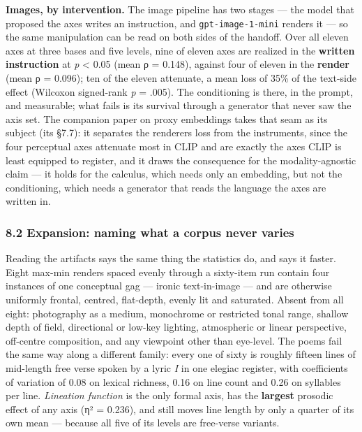 \documentclass[
  10pt,
]{article}
\theoremstyle{plain}
\theoremstyle{definition}
\begin{document}
\textbf{Images, by intervention.} The image pipeline has two stages ---
the model that proposed the axes writes an instruction, and
\texttt{gpt-image-1-mini} renders it --- so the same manipulation can be
read on both sides of the handoff. Over all eleven axes at three bases
and five levels, nine of eleven axes are realized in the \textbf{written
instruction} at \emph{p} \textless{} 0.05 (mean ρ = 0.148), against four
of eleven in the \textbf{render} (mean ρ = 0.096); ten of the eleven
attenuate, a mean loss of 35\% of the text-side effect (Wilcoxon
signed-rank \emph{p} = .005). The conditioning is there, in the prompt,
and measurable; what fails is its survival through a generator that
never saw the axis set. The companion paper on proxy embeddings takes
that seam as its subject (its §7.7): it separates the
renderer\textquotesingle s loss from the instrument\textquotesingle s,
since the four perceptual axes attenuate most in CLIP and are exactly
the axes CLIP is least equipped to register, and it draws the
consequence for the modality-agnostic claim --- it holds for the
calculus, which needs only an embedding, but not the conditioning, which
needs a generator that reads the language the axes are written in.

\subsubsection{8.2 Expansion: naming what a corpus never
varies}\label{82-expansion-naming-what-a-corpus-never-varies}

Reading the artifacts says the same thing the statistics do, and says it
faster. Eight max-min renders spaced evenly through a sixty-item run
contain four instances of one conceptual gag --- ironic text-in-image
--- and are otherwise uniformly frontal, centred, flat-depth, evenly lit
and saturated. Absent from all eight: photography as a medium,
monochrome or restricted tonal range, shallow depth of field,
directional or low-key lighting, atmospheric or linear perspective,
off-centre composition, and any viewpoint other than eye-level. The
poems fail the same way along a different family: every one of sixty is
roughly fifteen lines of mid-length free verse spoken by a lyric
\emph{I} in one elegiac register, with coefficients of variation of 0.08
on lexical richness, 0.16 on line count and 0.26 on syllables per line.
\emph{Lineation function} is the only formal axis, has the
\textbf{largest} prosodic effect of any axis (η² = 0.236), and still
moves line length by only a quarter of its own mean --- because all five
of its levels are free-verse variants.
\end{document}
